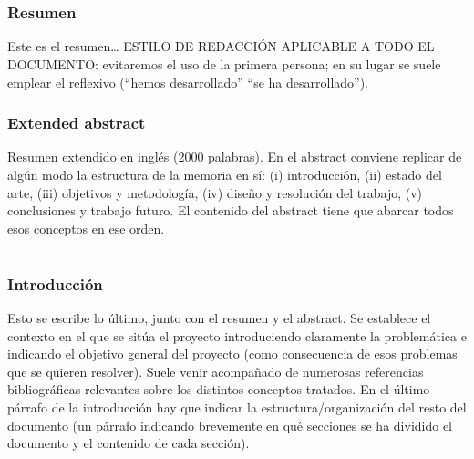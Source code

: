 \documentclass[12pt]{article}
\begin{document}
\pagestyle{empty}
\setcounter{page}{1}
\part*{}
\tableofcontents
\newpage
\listoffigures
\newpage
\clearpage
\pagestyle{fancy}

\section{Resumen}
Este es el resumen…
ESTILO DE REDACCIÓN APLICABLE A TODO EL DOCUMENTO: evitaremos el uso de la primera persona; en su lugar se suele emplear el reflexivo (“hemos desarrollado” “se ha desarrollado”).

\newpage

\section{Extended abstract}
Resumen extendido en inglés (2000 palabras). En el abstract conviene replicar de algún modo la estructura de la memoria en sí: (i) introducción, (ii) estado del arte, (iii) objetivos y metodología, (iv) diseño y resolución del trabajo, (v) conclusiones y trabajo futuro. El contenido del abstract tiene que abarcar todos esos conceptos en ese orden.

\cleardoublepage

\part*{}
\setcounter{page}{1} %

\section{Introducción}
Esto se escribe lo último, junto con el resumen y el abstract. Se establece el contexto en el que se sitúa el proyecto introduciendo claramente la problemática e indicando el objetivo general del proyecto (como consecuencia de esos problemas que se quieren resolver). Suele venir acompañado de numerosas referencias bibliográficas relevantes sobre los distintos conceptos tratados. En el último párrafo de la introducción hay que indicar la estructura/organización del resto del documento (un párrafo indicando brevemente en qué secciones se ha dividido el documento y el contenido de cada sección).
\end{document}
